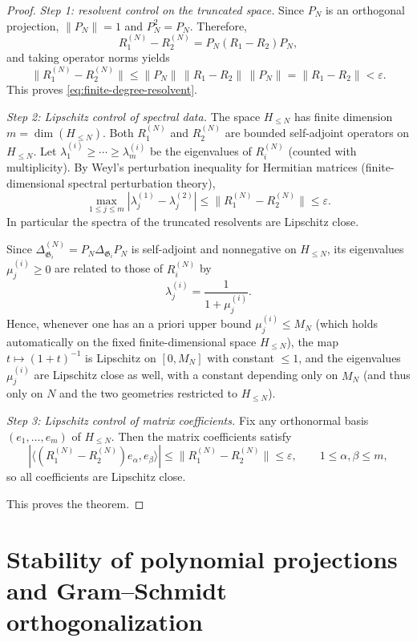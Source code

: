 \documentclass{amsart}
\numberwithin{equation}{section}
\theoremstyle{definition}
\theoremstyle{remark}
\begin{document}
\begin{proof}
\emph{Step 1: resolvent control on the truncated space.}
Since $P_N$ is an orthogonal projection, $\|P_N\|=1$ and $P_N^2=P_N$.
Therefore,
\[
R_1^{(N)}-R_2^{(N)} = P_N(R_1-R_2)P_N,
\]
and taking operator norms yields
\[
\|R_1^{(N)}-R_2^{(N)}\|
\le \|P_N\|\,\|R_1-R_2\|\,\|P_N\|
= \|R_1-R_2\|
<\varepsilon.
\]
This proves \eqref{eq:finite-degree-resolvent}.

\medskip
\emph{Step 2: Lipschitz control of spectral data.}
The space $H_{\le N}$ has finite dimension $m=\dim(H_{\le N})$.
Both $R_1^{(N)}$ and $R_2^{(N)}$ are bounded self-adjoint operators on $H_{\le N}$.
Let $\lambda_1^{(i)}\ge\cdots\ge \lambda_m^{(i)}$ be the eigenvalues of $R_i^{(N)}$ (counted with multiplicity).
By Weyl's perturbation inequality for Hermitian matrices (finite-dimensional spectral perturbation theory),
\[
\max_{1\le j\le m} |\lambda_j^{(1)}-\lambda_j^{(2)}|
\le \|R_1^{(N)}-R_2^{(N)}\|
\le \varepsilon.
\]
In particular the spectra of the truncated resolvents are Lipschitz close.

Since $\Delta_{\mathfrak G_i}^{(N)}=P_N\Delta_{\mathfrak G_i}P_N$ is self-adjoint and nonnegative on $H_{\le N}$,
its eigenvalues $\mu_j^{(i)}\ge 0$ are related to those of $R_i^{(N)}$ by
\[
\lambda_j^{(i)}=\frac{1}{1+\mu_j^{(i)}}.
\]
Hence, whenever one has an a priori upper bound $\mu_j^{(i)}\le M_N$ (which holds automatically on the fixed
finite-dimensional space $H_{\le N}$), the map $t\mapsto (1+t)^{-1}$ is Lipschitz on $[0,M_N]$ with constant
$\le 1$, and the eigenvalues $\mu_j^{(i)}$ are Lipschitz close as well, with a constant depending only on $M_N$
(and thus only on $N$ and the two geometries restricted to $H_{\le N}$).

\medskip
\emph{Step 3: Lipschitz control of matrix coefficients.}
Fix any orthonormal basis $(e_1,\dots,e_m)$ of $H_{\le N}$.
Then the matrix coefficients satisfy
\[
|\langle (R_1^{(N)}-R_2^{(N)})e_\alpha,e_\beta\rangle|
\le \|R_1^{(N)}-R_2^{(N)}\|
\le \varepsilon,
\qquad 1\le \alpha,\beta\le m,
\]
so all coefficients are Lipschitz close.

This proves the theorem.
\end{proof}


\section{Stability of polynomial projections and Gram--Schmidt orthogonalization}
\label{sec:GS-stability}
\end{document}
